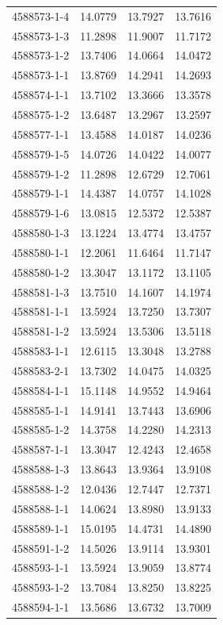 \begin{longtable}{lrrr}
4588573-1-4 & 14.0779 & 13.7927 & 13.7616 \\
4588573-1-3 & 11.2898 & 11.9007 & 11.7172 \\
4588573-1-2 & 13.7406 & 14.0664 & 14.0472 \\
4588573-1-1 & 13.8769 & 14.2941 & 14.2693 \\
4588574-1-1 & 13.7102 & 13.3666 & 13.3578 \\
4588575-1-2 & 13.6487 & 13.2967 & 13.2597 \\
4588577-1-1 & 13.4588 & 14.0187 & 14.0236 \\
4588579-1-5 & 14.0726 & 14.0422 & 14.0077 \\
4588579-1-2 & 11.2898 & 12.6729 & 12.7061 \\
4588579-1-1 & 14.4387 & 14.0757 & 14.1028 \\
4588579-1-6 & 13.0815 & 12.5372 & 12.5387 \\
4588580-1-3 & 13.1224 & 13.4774 & 13.4757 \\
4588580-1-1 & 12.2061 & 11.6464 & 11.7147 \\
4588580-1-2 & 13.3047 & 13.1172 & 13.1105 \\
4588581-1-3 & 13.7510 & 14.1607 & 14.1974 \\
4588581-1-1 & 13.5924 & 13.7250 & 13.7307 \\
4588581-1-2 & 13.5924 & 13.5306 & 13.5118 \\
4588583-1-1 & 12.6115 & 13.3048 & 13.2788 \\
4588583-2-1 & 13.7302 & 14.0475 & 14.0325 \\
4588584-1-1 & 15.1148 & 14.9552 & 14.9464 \\
4588585-1-1 & 14.9141 & 13.7443 & 13.6906 \\
4588585-1-2 & 14.3758 & 14.2280 & 14.2313 \\
4588587-1-1 & 13.3047 & 12.4243 & 12.4658 \\
4588588-1-3 & 13.8643 & 13.9364 & 13.9108 \\
4588588-1-2 & 12.0436 & 12.7447 & 12.7371 \\
4588588-1-1 & 14.0624 & 13.8980 & 13.9133 \\
4588589-1-1 & 15.0195 & 14.4731 & 14.4890 \\
4588591-1-2 & 14.5026 & 13.9114 & 13.9301 \\
4588593-1-1 & 13.5924 & 13.9059 & 13.8774 \\
4588593-1-2 & 13.7084 & 13.8250 & 13.8225 \\
4588594-1-1 & 13.5686 & 13.6732 & 13.7009 \\

\end{longtable}
